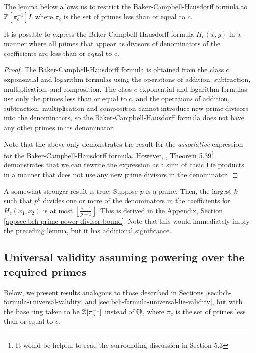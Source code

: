 The lemma below allows us to restrict the Baker-Campbell-Hausdorff
formula to $\mathbb{Z}[\pi_c^{-1}]L$ where $\pi_c$ is the set of primes
less than or equal to $c$.

\begin{lemma}\label{lemma:bch-primes-in-denominators}
  It is possible to express the Baker-Campbell-Hausdorff formula
  $H_c(x,y)$ in a manner where all primes that appear as divisors of
  denominators of the coefficients are less than or equal
  to $c$.
\end{lemma}

\begin{proof}
  The Baker-Campbell-Hausdorff formula is obtained from the class $c$
  exponential and logarithm formulas using the operations of addition,
  subtraction, multiplication, and composition. The class $c$
  exponential and logarithm formulas use only the primes less than or
  equal to $c$, and the operations of addition, subtraction,
  multiplication and composition cannot introduce new prime divisors
  into the denominators, so the Baker-Campbell-Hausdorff formula does
  not have any other primes in its denominator.

  Note that the above only demonstrates the result for the {\em
    associative} expression for the Baker-Campbell-Hausdorff
  formula. However, \cite{Khukhro}, Theorem 5.39\footnote{It would be
    helpful to read the surrounding discussion in Section 5.3}
  demonstrates that we can rewrite the expression as a sum of basic
  Lie products in a manner that does not use any new prime divisors
  in the denominator.
\end{proof}

A somewhat stronger result is true: Suppose $p$ is a prime. Then, the
largest $k$ such that $p^k$ divides one or more of the denominators in
the coefficients for $H_c(x_1,x_2)$ is at most $\left \lfloor \frac{c
  - 1}{p - 1}\right \rfloor$. This is derived in the Appendix, Section
\ref{appsec:bch-prime-power-divisor-bound}. Note that this would
immediately imply the preceding lemma, but it has additional
significance.

\subsection{Universal validity assuming powering over the required primes}

Below, we present results analogous to those described in Sections
\ref{sec:bch-formula-universal-validity} and
\ref{sec:bch-formula-universal-lie-validity}, but with the base ring
taken to be $\mathbb{Z}[\pi_c^{-1}]$ instead of $\mathbb{Q}$, where $\pi_c$ is the set of
primes less than or equal to $c$.

